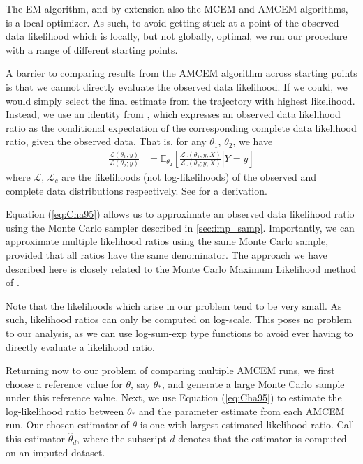 \documentclass[11pt, oneside]{article}   	%
\newcommand{\bE}{\mathbb{E}}
\begin{document}
The EM algorithm, and by extension also the MCEM and AMCEM algorithms, is a local optimizer. As such, to avoid getting stuck at a point of the observed data likelihood which is locally, but not globally, optimal, we run our procedure with a range of different starting points. 

A barrier to comparing results from the AMCEM algorithm across starting points is that we cannot directly evaluate the observed data likelihood. If we could, we would simply select the final estimate from the trajectory with highest likelihood. Instead, we use an identity from \citet{Cha95}, which expresses an observed data likelihood ratio as the conditional expectation of the corresponding complete data likelihood ratio, given the observed data. That is, for any $\theta_1$, $\theta_2$, we have
%
\begin{align}
	\frac{\mathcal{L}(\theta_1; y)}{\mathcal{L}(\theta_2; y)} &= \bE_{\theta_2} \left[ \left. \frac{\mathcal{L}_c(\theta_1; y, X)}{\mathcal{L}_c(\theta_2; y, X)} \right| Y=y \right] \label{eq:Cha95}
\end{align}
%
where $\mathcal{L}$, $\mathcal{L}_c$ are the likelihoods (not log-likelihoods) of the observed and complete data distributions respectively. See \citet{Cha95} for a derivation.

Equation (\ref{eq:Cha95}) allows us to approximate an observed data likelihood ratio using the Monte Carlo sampler described in \ref{sec:imp_samp}. Importantly, we can approximate multiple likelihood ratios using the same Monte Carlo sample, provided that all ratios have the same denominator. The approach we have described here is closely related to the Monte Carlo Maximum Likelihood method of \citet{Gey94}.

Note that the likelihoods which arise in our problem tend to be very small. As such, likelihood ratios can only be computed on log-scale. This poses no problem to our analysis, as we can use log-sum-exp type functions to avoid ever having to directly evaluate a likelihood ratio.

Returning now to our problem of comparing multiple AMCEM runs, we first choose a reference value for $\theta$, say $\theta_*$, and generate a large Monte Carlo sample under this reference value. Next, we use Equation (\ref{eq:Cha95}) to estimate the log-likelihood ratio between $\theta_*$ and the parameter estimate from each AMCEM run. Our chosen estimator of $\theta$ is one with largest estimated likelihood ratio. Call this estimator $\hat{\theta}_d$, where the subscript $d$ denotes that the estimator is computed on an imputed dataset.
\end{document}
